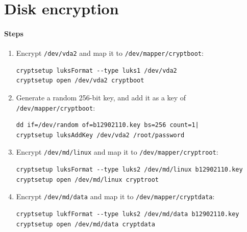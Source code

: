 \documentclass[12pt, a4paper]{article}
\begin{document}
  \section{Disk encryption}
  \paragraph{Steps}
  \begin{enumerate}
    \item Encrypt \verb|/dev/vda2| and map it to \verb|/dev/mapper/cryptboot|:
    \begin{verbatim}
cryptsetup luksFormat --type luks1 /dev/vda2
cryptsetup open /dev/vda2 cryptboot\end{verbatim}
    \item Generate a random 256-bit key, and add it as a key of
    \verb|/dev/mapper/cryptboot|:
    \begin{verbatim}
dd if=/dev/random of=b12902110.key bs=256 count=1|
cryptsetup luksAddKey /dev/vda2 /root/password\end{verbatim}
    \item Encrypt \verb|/dev/md/linux| and map it to \verb|/dev/mapper/cryptroot|:
    \begin{verbatim}
cryptsetup luksFormat --type luks2 /dev/md/linux b12902110.key
cryptsetup open /dev/md/linux cryptroot\end{verbatim}
    \item Encrypt \verb|/dev/md/data| and map it to \verb|/dev/mapper/cryptdata|:
     \begin{verbatim}
cryptsetup lukfFormat --type luks2 /dev/md/data b12902110.key
cryptsetup open /dev/md/data cryptdata\end{verbatim}
  \end{enumerate}
\end{document}
